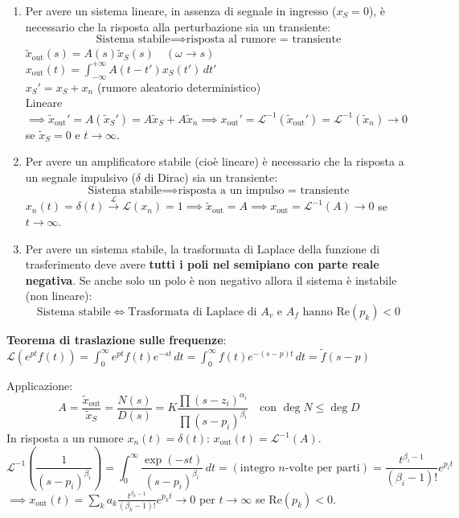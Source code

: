 \documentclass[11pt,a4paper]{report}
\begin{document}
\begin{enumerate}
    \item Per avere un sistema lineare, in assenza di segnale in ingresso ($x_S = 0$), è necessario che la risposta alla perturbazione sia un transiente:
    \[
        \text{Sistema stabile} \implies \text{risposta al rumore = transiente}
    \]
    $\tilde{x}_{\text{out}}(s) = A(s) \tilde{x}_S(s) \quad (\omega \to s)$ \\
    $x_{\text{out}}(t) = \int_{-\infty}^{+\infty} A(t-t') x_S(t') \, dt'$ \\
    $x_S' = x_S + x_n$ (rumore aleatorio deterministico) \\
    Lineare $\implies \tilde{x}_{\text{out}}' = A (\tilde{x}_S') = A \tilde{x}_S + A \tilde{x}_n \implies x_{\text{out}}' = \mathcal{L}^{-1}(\tilde{x}_{\text{out}}') = \mathcal{L}^{-1}(\tilde{x}_n) \to 0$ se $\tilde{x}_S = 0$ e $t \to \infty$.

    \item Per avere un amplificatore stabile (cioè lineare) è necessario che la risposta a un segnale impulsivo ($\delta$ di Dirac) sia un transiente:
    \[
        \text{Sistema stabile} \implies \text{risposta a un impulso = transiente}
    \]
    $x_n(t) = \delta(t) \xrightarrow{\mathcal{L}} \mathcal{L}(x_n) = 1 \implies \tilde{x}_{\text{out}} = A \implies x_{\text{out}} = \mathcal{L}^{-1}(A) \to 0$ se $t \to \infty$.

    \item Per avere un sistema stabile, la trasformata di Laplace della funzione di trasferimento deve avere \textbf{tutti i poli nel semipiano con parte reale negativa}. Se anche solo un polo è non negativo allora il sistema è instabile (non lineare):
    \[
        \text{Sistema stabile} \iff \text{Trasformata di Laplace di } A_v \text{ e } A_f \text{ hanno } \text{Re}(p_k) < 0
    \]
\end{enumerate}

\begin{note}
\textbf{Teorema di traslazione sulle frequenze}: \\
$\mathcal{L}(e^{pt} f(t)) = \int_0^\infty e^{pt} f(t) e^{-st} \, dt = \int_0^\infty f(t) e^{-(s-p)t} \, dt = \tilde{f}(s-p)$

Applicazione:
\[
    A = \frac{\tilde{x}_{\text{out}}}{\tilde{x}_S} = \frac{N(s)}{D(s)} = K \frac{\prod(s-z_i)^{\alpha_i}}{\prod(s-p_i)^{\beta_i}} \quad \text{con } \deg N \le \deg D
\]
In risposta a un rumore $x_n(t) = \delta(t)$: $x_{\text{out}}(t) = \mathcal{L}^{-1}(A)$.
\[
    \mathcal{L}^{-1}\left( \frac{1}{(s-p_i)^{\beta_i}} \right) = \int_0^\infty \frac{\exp(-st)}{(s-p_i)^{\beta_i}} \, dt = (\text{integro } n\text{-volte per parti}) = \frac{t^{\beta_i-1}}{(\beta_i-1)!} e^{p_i t}
\]
$\implies x_{\text{out}}(t) = \sum_k a_k \frac{t^{\beta_k-1}}{(\beta_k-1)!} e^{p_k t} \to 0$ per $t \to \infty$ se $\text{Re}(p_k) < 0$.
\end{note}
\end{document}
